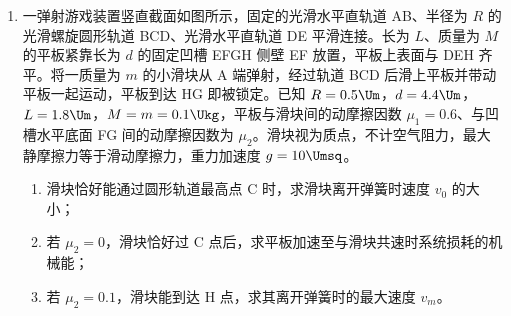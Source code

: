 \documentclass[\gkver]{gaokaozhenti}
\begin{document}
\begin{enumerate}
{\begin{enumerate}
	\item
	$4\times10^{-5}\Umc$

	\item
	$14.4\UJ$
\end{enumerate}
}

\item
一弹射游戏装置竖直截面如图所示，固定的光滑水平直轨道 AB、半径为 $R$ 的光滑螺旋圆形轨道 BCD、光滑水平直轨道 DE 平滑连接。长为 $L$、质量为 $M$ 的平板紧靠长为 $d$ 的固定凹槽 EFGH 侧壁 EF 放置，平板上表面与 DEH 齐平。将一质量为 $m$ 的小滑块从 A 端弹射，经过轨道 BCD 后滑上平板并带动平板一起运动，平板到达 HG 即被锁定。已知 $R = 0.5\Um$，$d = 4.4\Um$，$L = 1.8\Um$，$M = m = 0.1\Ukg$，平板与滑块间的动摩擦因数 $\mu_{1} = 0.6$、与凹槽水平底面 FG 间的动摩擦因数为 $\mu_{2}$。滑块视为质点，不计空气阻力，最大静摩擦力等于滑动摩擦力，重力加速度 $g = 10\Umsq$。

\begin{enumerate}
	\item
	滑块恰好能通过圆形轨道最高点 C 时，求滑块离开弹簧时速度 $v_{0}$ 的大小；
	\item
	若 $\mu_{2} = 0$，滑块恰好过 C 点后，求平板加速至与滑块共速时系统损耗的机械能；
	\item
	若 $\mu_{2} = 0.1$，滑块能到达 H 点，求其离开弹簧时的最大速度 $v_{m}$。
\end{enumerate}
\jdanswer{
\begin{enumerate}
	\item
	$5\Ums$

	\item
	$0.625\UJ$

	\item
	$6\Ums$
\end{enumerate}
}
\end{enumerate}
\end{document}
